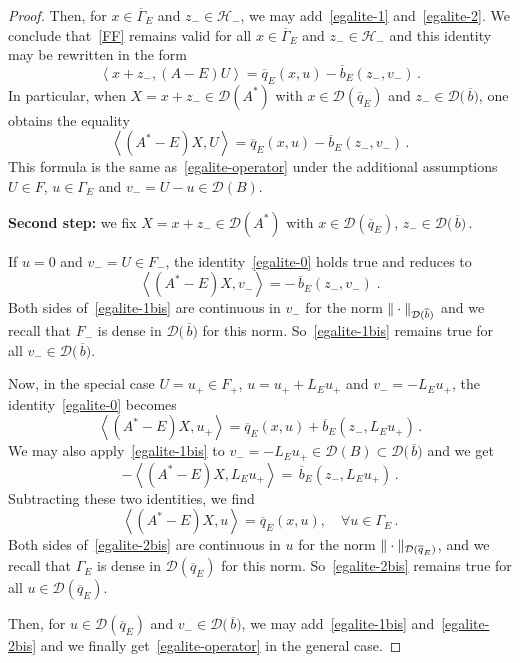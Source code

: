 \documentclass[12pt,reqno]{amsart}
\newcommand{\innerproduct}[2]{\left\langle #1, #2 \right\rangle}
\newcommand{\be}[1]{\begin{equation}\label{#1}}
\newcommand{\ee}{\end{equation}}
\renewcommand{\(}{\left(}
\renewcommand{\)}{\right)}
\begin{document}
\begin{proof}
\noindent
Then, for $x\in \overline{\Gamma}_E$ and $z_-\in \mathcal H_-$, we may add~\eqref{egalite-1} and~\eqref{egalite-2}. We conclude that~\eqref{FF} remains valid for all $x\in \overline{\Gamma}_E$ and $z_-\in \mathcal H_-$ and this identity may be rewritten in the form
\be{egalite-special}
\innerproduct{x+z_-}{(A-E)U} = \overline q_E(x,u)- \overline b_E(z_-,v_-)\,.
\ee
In particular, when $X=x+z_-\in \mathcal D(A^*)$ with $x\in \mathcal D(\overline{q}_E)$ and $z_-\in\mathcal D\big(\,\overline{b}\big)$, one obtains the equality
\be{egalite-0}
\innerproduct{(A^*-E)X}{U} = \overline q_E(x,u)- \overline b_E(z_-,v_-)\,.
\ee
This formula is the same as~\eqref{egalite-operator} under the additional assumptions $U\in F$, $u\in\Gamma_E$ and $v_-=U-u\in \mathcal D(B)$.\medskip

\noindent
{\bf Second step:} we fix $X=x+z_-\in \mathcal D(A^*)$ with $x\in \mathcal D(\overline{q}_E)$, $z_-\in\mathcal D\big(\,\overline{b}\big)\,$.\smallskip
\smallskip

\noindent
If $u=0$ and $v_-=U \in F_-$, the identity~\eqref{egalite-0} holds true and reduces to
\be{egalite-1bis}
\innerproduct{(A^*-E)X}{v_-}= -\,\overline b_E(z_-,v_-)\;.
\ee
Both sides of~\eqref{egalite-1bis} are continuous in $v_-$ for the norm $\Vert \cdot\Vert_{\mathcal D(\small{\overline{b}})}$
and we recall that $F_-$ is dense in $\mathcal D\big(\,\overline{b}\big)$ for this norm. So~\eqref{egalite-1bis} remains true for all $v_-\in \mathcal D\big(\,\overline{b}\big)$.\smallskip

\noindent Now, in the special case $U=u_+\in F_+$, $u=u_++L_E u_+$ and $v_-=-L_E u_+$, the identity~\eqref{egalite-0} becomes
\[ \innerproduct{(A^*-E)X}{u_+}= \overline q_E(x,u)+\overline b_E(z_-,L_E u_+)\,.\]
We may also apply~\eqref{egalite-1bis} to $v_-=-L_E u_+\in \mathcal D(B)\subset \mathcal D\big(\,\overline{b}\big)$ and we get
\[ -\innerproduct{(A^*-E)X}{L_E u_+}= \,\overline b_E(z_-,L_E u_+)\,.\]
Subtracting these two identities, we find
\be{egalite-2bis}
\innerproduct{(A^*-E)X}{u}= \overline q_E(x,u),\quad\forall u\in\Gamma_E\,.
\ee
Both sides of~\eqref{egalite-2bis} are continuous in $u$ for the norm $\Vert \cdot\Vert_{\mathcal D(\small{\overline{q}_E})}$, and we recall that $\Gamma_E$ is dense in $\mathcal D(\overline{q}_E)$ for this norm. So~\eqref{egalite-2bis} remains true for all $u\in \mathcal D(\overline{q}_E)$.\smallskip

\noindent
Then, for $u\in \mathcal D(\overline{q}_E)$ and $v_-\in \mathcal D\big(\,\overline{b}\big)$, we may add~\eqref{egalite-1bis} and~\eqref{egalite-2bis} and we finally get~\eqref{egalite-operator} in the general case.
\end{proof}
\end{document}
